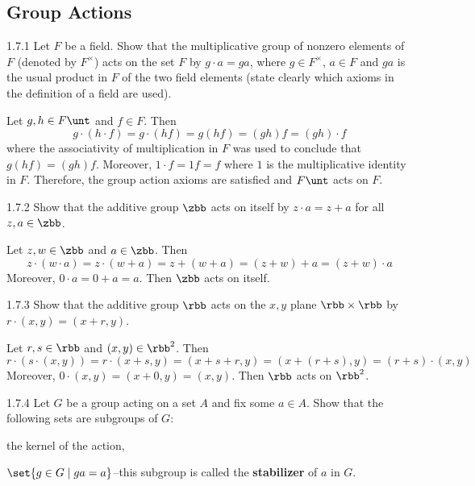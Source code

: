\subsection{Group Actions}

\begin{exercise}{1.7.1}
    Let $F$ be a field.
	Show that the multiplicative group of nonzero elements of $F$ (denoted by $F^\times$) acts on the set $F$ by $g\cdot a = g a$, where $g\in F^\times$, $a\in F$ and $ga$ is the usual product in $F$ of the two field elements (state clearly which axioms in the definition of a field are used). 
\end{exercise}

\begin{sol}
    Let $g, h \in F\unt$ and $f \in F$.
	Then
    \[
    	g \cdot (h \cdot f) = g \cdot (hf) = g(hf) = (gh)f = (gh) \cdot f
    \]
    where the associativity of multiplication in $F$ was used to conclude that $g(hf) = (gh)f$.
	Moreover, $1 \cdot f = 1f = f$ where $1$ is the multiplicative identity in $F$.
	Therefore, the group action axioms are satisfied and $F\unt$ acts on $F$.
\end{sol}

\begin{exercise}{1.7.2}
    Show that the additive group $\zbb$ acts on itself by $z\cdot a = z + a$ for all $z,a\in\zbb$.
\end{exercise}

\begin{sol}
    Let $z, w \in \zbb$ and $a \in \zbb$.
	Then
    \[
    	z \cdot (w \cdot a) = z \cdot (w + a) = z + (w + a) = (z + w) + a = (z + w) \cdot a
    \]
    Moreover, $0 \cdot a = 0 + a = a$.
	Then $\zbb$ acts on itself.
\end{sol}

\begin{exercise}{1.7.3}
    Show that the additive group $\rbb$ acts on the $x,y$ plane $\rbb\times\rbb$ by $r\cdot (x,y) = (x + r, y)$.
\end{exercise}

\begin{sol}
    Let $r, s \in \rbb$ and $(x, y) \in \rbb^2$.
	Then
    \[
    	r \cdot (s \cdot (x, y)) = r \cdot (x + s, y) = (x + s + r, y) = (x + (r + s), y) = (r + s) \cdot (x, y)
    \]
    Moreover, $0 \cdot (x, y) = (x + 0, y) = (x, y)$.
	Then $\rbb$ acts on $\rbb^2$.
\end{sol}

\begin{spex}{1.7.4}
    Let $G$ be a group acting on a set $A$ and fix some $a\in A$.
	Show that the following sets are subgroups of $G$:
    \begin{subexercises}
        \item the kernel of the action,
        \item $\set{g\in G \mid g a = a}$--this subgroup is called the \textbf{stabilizer} of $a$ in $G$.
    \end{subexercises}
\end{spex}


